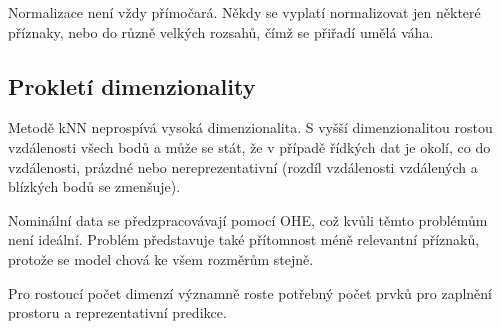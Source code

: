Normalizace není vždy přímočará. Někdy se vyplatí normalizovat jen některé příznaky, nebo do různě velkých rozsahů, čímž se přiřadí umělá váha.

\subsection{Prokletí dimenzionality}

Metodě kNN neprospívá vysoká dimenzionalita. S vyšší dimenzionalitou rostou vzdálenosti všech bodů a může se stát, že v případě řídkých dat je okolí, co do vzdálenosti, prázdné nebo nereprezentativní (rozdíl vzdálenosti vzdálených a blízkých bodů se zmenšuje).

Nominální data se předzpracovávají pomocí OHE, což kvůli těmto problémům není ideální. Problém představuje také přítomnost méně relevantní příznaků, protože se model chová ke všem rozměrům stejně.

Pro rostoucí počet dimenzí významně roste potřebný počet prvků pro zaplnění prostoru a reprezentativní predikce.
